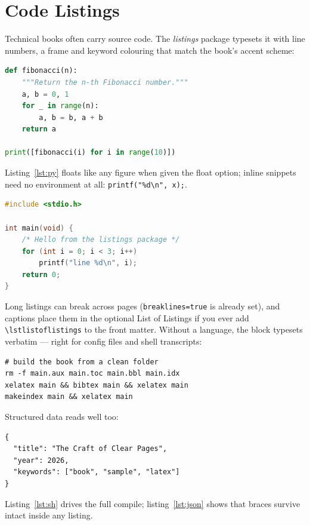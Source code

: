 %
\chapter{Code Listings}\label{ch:code}

Technical books often carry source code. The \emph{listings} package
typesets it with line numbers, a frame and keyword colouring that
match the book's accent scheme:

\begin{lstlisting}[language=Python, caption={A tiny Python function.}, label={lst:py}]
def fibonacci(n):
    """Return the n-th Fibonacci number."""
    a, b = 0, 1
    for _ in range(n):
        a, b = b, a + b
    return a

print([fibonacci(i) for i in range(10)])
\end{lstlisting}

Listing~\ref{lst:py} floats like any figure when given the float
option; inline snippets need no environment at all:
\lstinline|printf("%d\n", x);|.

\begin{lstlisting}[language=C, caption={C, for good measure.}, label={lst:c}]
#include <stdio.h>

int main(void) {
    /* Hello from the listings package */
    for (int i = 0; i < 3; i++)
        printf("line %d\n", i);
    return 0;
}
\end{lstlisting}

Long listings can break across pages (\texttt{breaklines=true} is
already set), and captions place them in the optional List of
Listings if you ever add \texttt{\textbackslash lstlistoflistings} to the front matter.
Without a language, the block typesets verbatim --- right for
config files and shell transcripts:

\begin{lstlisting}[caption={A language-free (verbatim) listing.}, label={lst:sh}]
# build the book from a clean folder
rm -f main.aux main.toc main.bbl main.idx
xelatex main && bibtex main && xelatex main
makeindex main && xelatex main
\end{lstlisting}

Structured data reads well too:

\begin{lstlisting}[caption={A JSON fragment.}, label={lst:json}]
{
  "title": "The Craft of Clear Pages",
  "year": 2026,
  "keywords": ["book", "sample", "latex"]
}
\end{lstlisting}

Listing~\ref{lst:sh} drives the full compile; listing~\ref{lst:json}
shows that braces survive intact inside any listing.
